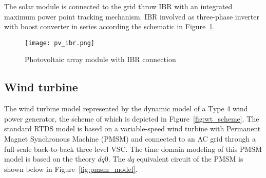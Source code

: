 The solar module is connected to the grid throw IBR with an integrated maximum power point tracking mechanism. IBR involved as three-phase inverter with boost converter in series according the schematic in Figure~\cref{fig:pv_ibr}.

\begin{figure}[ht]
    \centering
    \texttt{[image: pv\_ibr.png]}
    \caption{Photovoltaic array module with IBR connection}
    \label{fig:pv_ibr}
\end{figure}


\subsection{Wind turbine}\label{subsec:ch4/sec1/sub2}

The wind turbine model represented by the dynamic model of a Type 4 wind power generator, the scheme of which is depicted in Figure~\cref{fig:wt_scheme}. The standard RTDS model is based on a variable-speed wind turbine with Permanent Magnet Synchronous Machine (PMSM) and connected to an AC grid through a full-scale back-to-back three-level VSC. The time domain modeling of this PMSM model is based on the theory $dq0$. The $dq$ equivalent circuit of the PMSM is shown below in Figure~\cref{fig:pmsm_model}. 

